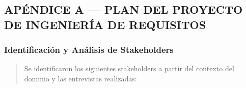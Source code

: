 \documentclass[
]{article}
\begin{document}
\subsection{APÉNDICE A --- PLAN DEL PROYECTO DE INGENIERÍA DE
REQUISITOS}\label{apuxe9ndice-a-plan-del-proyecto-de-ingenieruxeda-de-requisitos}

\subsubsection{Identificación y Análisis de
Stakeholders}\label{identificaciuxf3n-y-anuxe1lisis-de-stakeholders}

\begin{quote}
Se identificaron los siguientes stakeholders a partir del contexto del
dominio y las entrevistas realizadas:
\end{quote}
\end{document}
